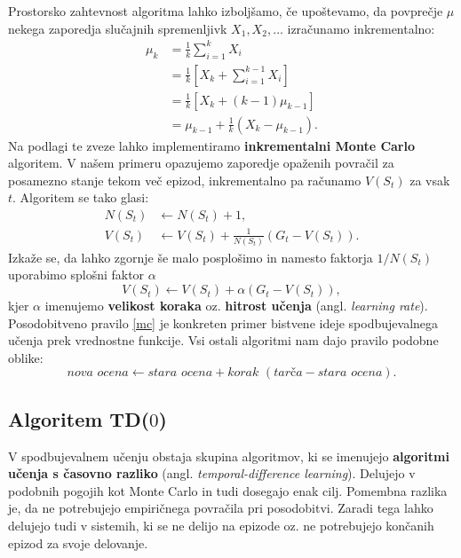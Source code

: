 \documentclass[12pt,a4paper]{amsart}
\theoremstyle{definition} %
\theoremstyle{plain} %
\begin{document}
Prostorsko zahtevnost algoritma lahko izboljšamo, če upoštevamo, da povprečje $\mu$ nekega zaporedja 
slučajnih spremenljivk $X_1, X_2, \dots$ izračunamo inkrementalno:
\begin{align*}
    \mu_k &= \frac{1}{k} \sum_{i = 1}^k X_i \\
        &= \frac{1}{k} \left[X_k + \sum_{i = 1}^{k-1} X_i \right] \\
        &= \frac{1}{k} \left[X_k + (k-1) \mu_{k-1} \right] \\
        &= \mu_{k-1} + \frac{1}{k} \left(X_k - \mu_{k-1} \right).
\end{align*}
Na podlagi te zveze lahko implementiramo \textbf{inkrementalni Monte Carlo} algoritem. V našem primeru
opazujemo zaporedje opaženih povračil za posamezno stanje tekom več epizod, inkrementalno pa računamo 
$V(S_t)$ za vsak $t$. Algoritem se tako glasi:
\begin{align*}
    N(S_t) &\leftarrow N(S_t) + 1, \\
    V(S_t) &\leftarrow V(S_t) + \frac{1}{N(S_t)} (G_t - V(S_t)).
\end{align*}
Izkaže se, da lahko zgornje še malo posplošimo in namesto faktorja $1/N(S_t)$ uporabimo splošni 
faktor $\alpha$
\begin{equation}\label{mc}
    V(S_t) \leftarrow V(S_t) + \alpha (G_t - V(S_t)),
\end{equation}
kjer $\alpha$ imenujemo \textbf{velikost koraka} oz. \textbf{hitrost učenja} (angl. 
\textit{learning rate}). Posodobitveno pravilo \eqref{mc} je konkreten primer bistvene ideje 
spodbujevalnega učenja prek vrednostne funkcije. Vsi ostali algoritmi nam dajo pravilo podobne 
oblike: 
\begin{equation}\label{osnova}
    \textit{nova ocena} \leftarrow \textit{stara ocena} + \textit{korak } 
    (\textit{tarča} - \textit{stara ocena}).
\end{equation}

\subsection{Algoritem TD($0$)}
V spodbujevalnem učenju obstaja skupina algoritmov, ki se imenujejo \textbf{algoritmi učenja s 
časovno razliko} (angl. \textit{temporal-difference learning}). Delujejo v podobnih pogojih kot 
Monte Carlo in tudi dosegajo enak cilj. Pomembna razlika je, da ne potrebujejo empiričnega povračila 
pri posodobitvi. Zaradi tega lahko delujejo tudi v sistemih, ki se ne delijo na epizode oz. ne 
potrebujejo končanih epizod za svoje delovanje.
\end{document}
